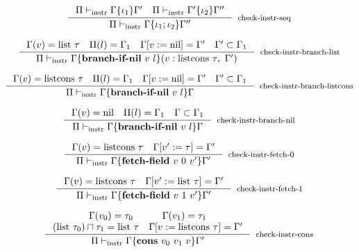 \documentclass[sigconf]{acmart}
\theoremstyle{definition}
\begin{document}

\begin{equation}
\inference{\Pi \vdash_{\text{instr}} \Gamma\{ \iota_1 \}\Gamma'~~~\Pi \vdash_{\text{instr}} \Gamma'\{ \iota_2 \}\Gamma''}
          {\Pi \vdash_{\text{instr}} \Gamma\{ \iota_1 ; \iota_2 \}\Gamma''}[check-instr-seq]
\end{equation}

\begin{equation}
\inference{\Gamma(v) = \text{list}~\tau~~~\Pi(l) = \Gamma_1~~~\Gamma[v:=\text{nil}]=\Gamma'~~~\Gamma' \subset \Gamma_1}
          {\Pi \vdash_{\text{instr}} \Gamma\{ \textbf{branch-if-nil}~v~l \}(v: \text{listcons}~\tau,~\Gamma')}[check-instr-branch-list]
\end{equation}

\begin{equation}
\inference{\Gamma(v) = \text{listcons}~\tau~~~\Pi(l) = \Gamma_1~~~\Gamma[v:=\text{nil}]=\Gamma'~~~\Gamma' \subset \Gamma_1}
          {\Pi \vdash_{\text{instr}} \Gamma\{ \textbf{branch-if-nil}~v~l \}\Gamma}[check-instr-branch-listcons]
\end{equation}

\begin{equation}
\inference{\Gamma(v) = \text{nil}~~~\Pi(l) = \Gamma_1~~~\Gamma \subset \Gamma_1}
          {\Pi \vdash_{\text{instr}} \Gamma\{ \textbf{branch-if-nil}~v~l \}\Gamma}[check-instr-branch-nil]
\end{equation}

\begin{equation}
\inference{\Gamma(v) = \text{listcons}~\tau~~~\Gamma[v':=\tau]=\Gamma'}
          {\Pi \vdash_{\text{instr}} \Gamma\{ \textbf{fetch-field}~v~0~v' \}\Gamma'}[check-instr-fetch-0]
\end{equation}

\begin{equation}
\inference{\Gamma(v) = \text{listcons}~\tau~~~\Gamma[v':=\text{list}~\tau]=\Gamma'}
          {\Pi \vdash_{\text{instr}} \Gamma\{ \textbf{fetch-field}~v~1~v' \}\Gamma'}[check-instr-fetch-1]
\end{equation}

\begin{equation}
\inference{\Gamma(v_0) = \tau_0~~~~~~~~~\Gamma(v_1) = \tau_1 \\ (\text{list}~\tau_0) \sqcap \tau_1=\text{list}~\tau~~~\Gamma[v:=\text{listcons}~\tau]=\Gamma'}
          {\Pi \vdash_{\text{instr}} \Gamma\{ \textbf{cons}~v_0~v_1~v \}\Gamma'}[check-instr-cons]
\end{equation}
\end{document}
